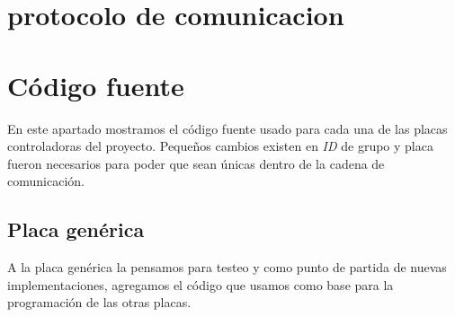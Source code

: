 
\section{protocolo de comunicacion}
\label{hA_protocolo}

\section{C\'odigo fuente}
\label{hA_source}

En este apartado mostramos el c\'odigo fuente usado para cada una de las placas controladoras
del proyecto.
Peque\~nos cambios existen en \emph{ID} de grupo y placa fueron necesarios para poder que sean
\'unicas dentro de la cadena de comunicaci\'on.

\subsection{Placa gen\'erica}
\label{hA_source_gen}

A la placa gen\'erica la pensamos para testeo y como punto de partida de nuevas
implementaciones, agregamos el c\'odigo que usamos como base para la programaci\'on de las otras
placas.

